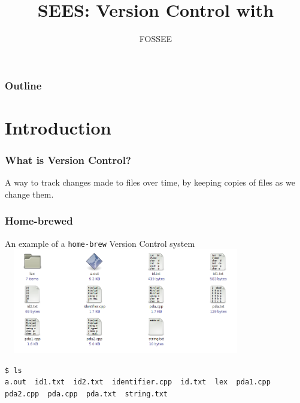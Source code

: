 \documentclass[14pt,compress]{beamer}
\title[Mercurial]{SEES: Version Control with \typ{hg}}
\author[FOSSEE] {FOSSEE}
\institute[IIT Bombay] {Department of Aerospace Engineering\\IIT Bombay}
\date[]{}
\newcounter{time}
\newcommand{\typ}[1]{\lstinline{#1}}
\begin{document}
\begin{frame}
  \maketitle
\end{frame}

\begin{frame}
  \frametitle{Outline}
  \tableofcontents
\end{frame}


\section{Introduction}

\begin{frame}
  \frametitle{What is Version Control?}
  \begin{block}{}
    A way to track changes made to files over time, by keeping copies
    of files as we change them.
  \end{block}
\end{frame}

\begin{frame}[fragile]
  \frametitle{Home-brewed}
  \begin{center}
    An example of a \typ{home-brew} Version Control system
    \includegraphics[height=1.8in,width=4.2in]{images/folder.png}
  \end{center}
  \begin{lstlisting} 
$ ls
a.out  id1.txt  id2.txt  identifier.cpp  id.txt  lex  pda1.cpp  pda2.cpp  pda.cpp  pda.txt  string.txt
  \end{lstlisting} %
\end{frame}
\end{document}
